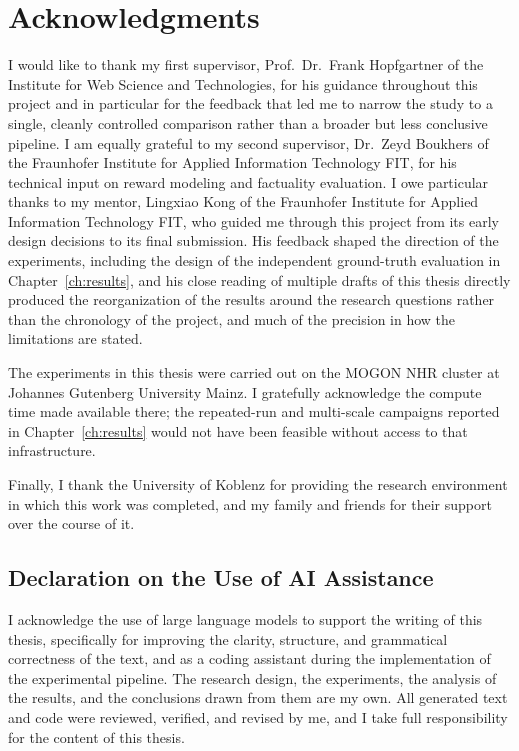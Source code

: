 
\chapter*{Acknowledgments}

I would like to thank my first supervisor, Prof.\ Dr.\ Frank Hopfgartner of the
Institute for Web Science and Technologies, for his guidance throughout this
project and in particular for the feedback that led me to narrow the study to a
single, cleanly controlled comparison rather than a broader but less conclusive
pipeline. I am equally grateful to my second supervisor, Dr.\ Zeyd Boukhers of the
Fraunhofer Institute for Applied Information Technology FIT, for his technical
input on reward modeling and factuality evaluation. I owe particular thanks to
my mentor, Lingxiao Kong of the Fraunhofer Institute for Applied Information
Technology FIT, who guided me through this project from its early design
decisions to its final submission. His feedback shaped the direction of the
experiments, including the design of the independent ground-truth evaluation
in Chapter~\ref{ch:results}, and his close reading of multiple drafts of this
thesis directly produced the reorganization of the results around the research
questions rather than the chronology of the project, and much of the precision
in how the limitations are stated.

The experiments in this thesis were carried out on the MOGON NHR cluster at
Johannes Gutenberg University Mainz. I gratefully acknowledge the compute time made
available there; the repeated-run and multi-scale campaigns reported in
Chapter~\ref{ch:results} would not have been feasible without access to that
infrastructure.

Finally, I thank the University of Koblenz for providing the research environment
in which this work was completed, and my family and friends for their support over
the course of it.

\section*{Declaration on the Use of AI Assistance}

I acknowledge the use of large language models to support the writing of this
thesis, specifically for improving the clarity, structure, and grammatical
correctness of the text, and as a coding assistant during the implementation of the
experimental pipeline. The research design, the experiments, the analysis of the
results, and the conclusions drawn from them are my own. All generated text and
code were reviewed, verified, and revised by me, and I take full responsibility for
the content of this thesis.
